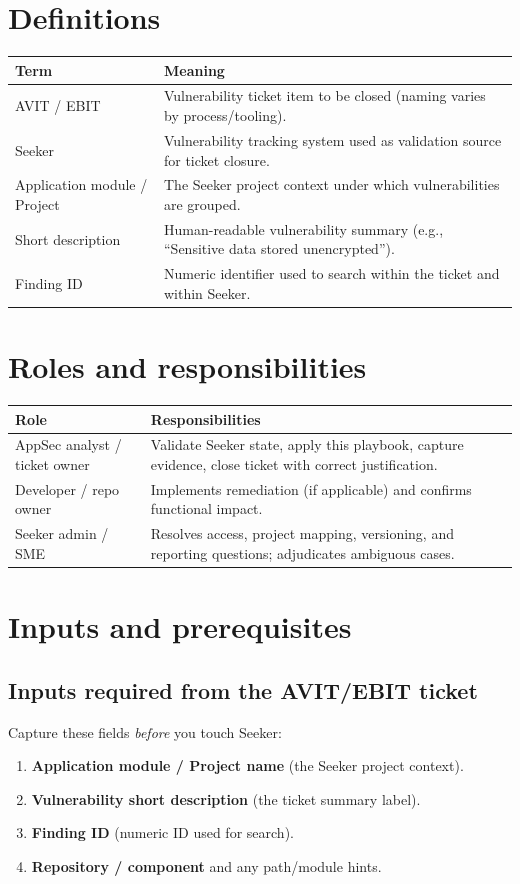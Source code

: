 \documentclass[11pt]{article}
\begin{document}
\section{Definitions}
\begin{tabularx}{\textwidth}{@{} l X @{}}
\toprule
\textbf{Term} & \textbf{Meaning} \\
\midrule
AVIT / EBIT & Vulnerability ticket item to be closed (naming varies by process/tooling). \\
Seeker & Vulnerability tracking system used as validation source for ticket closure. \\
Application module / Project & The Seeker project context under which vulnerabilities are grouped. \\
Short description & Human-readable vulnerability summary (e.g., ``Sensitive data stored unencrypted''). \\
Finding ID & Numeric identifier used to search within the ticket and within Seeker. \\
\bottomrule
\end{tabularx}

\section{Roles and responsibilities}
\begin{tabularx}{\textwidth}{@{} l X @{}}
\toprule
\textbf{Role} & \textbf{Responsibilities} \\
\midrule
AppSec analyst / ticket owner & Validate Seeker state, apply this playbook, capture evidence, close ticket with correct justification. \\
Developer / repo owner & Implements remediation (if applicable) and confirms functional impact. \\
Seeker admin / SME & Resolves access, project mapping, versioning, and reporting questions; adjudicates ambiguous cases. \\
\bottomrule
\end{tabularx}

\section{Inputs and prerequisites}
\subsection*{Inputs required from the AVIT/EBIT ticket}
Capture these fields \emph{before} you touch Seeker:
\begin{enumerate}[leftmargin=*]
  \item \textbf{Application module / Project name} (the Seeker project context).
  \item \textbf{Vulnerability short description} (the ticket summary label).
  \item \textbf{Finding ID} (numeric ID used for search).
  \item \textbf{Repository / component} and any path/module hints.
\end{enumerate}
\end{document}
